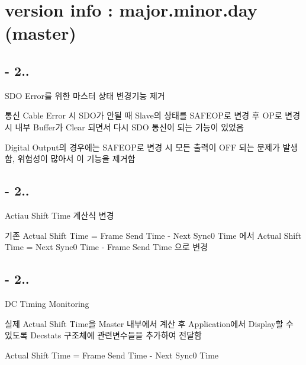 \section*{version info \-: major.\-minor.\-day (master)}

\par
 \subsection*{-\/ 2..}


\begin{DoxyEnumerate}
\item S\-D\-O Error를 위한 마스터 상태 변경기능 제거
\begin{DoxyItemize}
\item 통신 Cable Error 시 S\-D\-O가 안될 때 Slave의 상태를 S\-A\-F\-E\-O\-P로 변경 후 O\-P로 변경 시 내부 Buffer가 Clear 되면서 다시 S\-D\-O 통신이 되는 기능이 있었음
\item Digital Output의 경우에는 S\-A\-F\-E\-O\-P로 변경 시 모든 출력이 O\-F\-F 되는 문제가 발생함, 위험성이 많아서 이 기능을 제거함
\end{DoxyItemize}
\end{DoxyEnumerate}

\subsection*{-\/ 2..}


\begin{DoxyEnumerate}
\item Actiau Shift Time 계산식 변경
\begin{DoxyItemize}
\item 기존 Actual Shift Time = Frame Send Time -\/ Next Sync0 Time 에서 Actual Shift Time = Next Sync0 Time -\/ Frame Send Time 으로 변경
\end{DoxyItemize}
\end{DoxyEnumerate}

\subsection*{-\/ 2..}


\begin{DoxyEnumerate}
\item D\-C Timing Monitoring
\begin{DoxyItemize}
\item 실제 Actual Shift Time을 Master 내부에서 계산 후 Application에서 Display할 수 있도록 Decstats 구조체에 관련변수들을 추가하여 전달함
\item Actual Shift Time = Frame Send Time -\/ Next Sync0 Time
\end{DoxyItemize}
\end{DoxyEnumerate}

